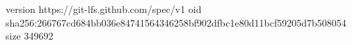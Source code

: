 version https://git-lfs.github.com/spec/v1
oid sha256:266767cd684bb036e84741564346258bf902dfbc1e80d11bcf59205d7b508054
size 349692
